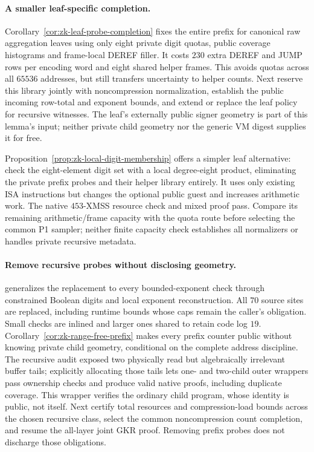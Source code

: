 \paragraph{A smaller leaf-specific completion.} Corollary~\ref{cor:zk-leaf-probe-completion} fixes the entire prefix for canonical raw aggregation leaves using only eight private digit quotas, public coverage histograms and frame-local DEREF filler. It costs $230$ extra DEREF and JUMP rows per encoding word and eight shared helper frames. This avoids quotas across all $65536$ addresses, but still transfers uncertainty to helper counts. Next reserve this library jointly with noncompression normalization, establish the public incoming row-total and exponent bounds, and extend or replace the leaf policy for recursive witnesses. The leaf's externally public signer geometry is part of this lemma's input; neither private child geometry nor the generic VM digest supplies it for free.

Proposition~\ref{prop:zk-local-digit-membership} offers a simpler leaf alternative: check the eight-element digit set with a local degree-eight product, eliminating the private prefix probes and their helper library entirely. It uses only existing ISA instructions but changes the optional public guest and increases arithmetic work. The native $453$-XMSS resource check and mixed proof pass. Compare its remaining arithmetic/frame capacity with the quota route before selecting the common P1 sampler; neither finite capacity check establishes all normalizers or handles private recursive metadata.

\paragraph{Remove recursive probes without disclosing geometry.}  generalizes the replacement to every bounded-exponent check through constrained Boolean digits and local exponent reconstruction. All $70$ source sites are replaced, including runtime bounds whose caps remain the caller's obligation. Small checks are inlined and larger ones shared to retain code log $19$. Corollary~\ref{cor:zk-range-free-prefix} makes every prefix counter public without knowing private child geometry, conditional on the complete address discipline. The recursive audit exposed two physically read but algebraically irrelevant buffer tails; explicitly allocating those tails lets one- and two-child outer wrappers pass ownership checks and produce valid native proofs, including duplicate coverage. This wrapper verifies the ordinary child program, whose identity is public, not itself. Next certify total resources and compression-load bounds across the chosen recursive class, select the common noncompression count completion, and resume the all-layer joint GKR proof. Removing prefix probes does not discharge those obligations.

